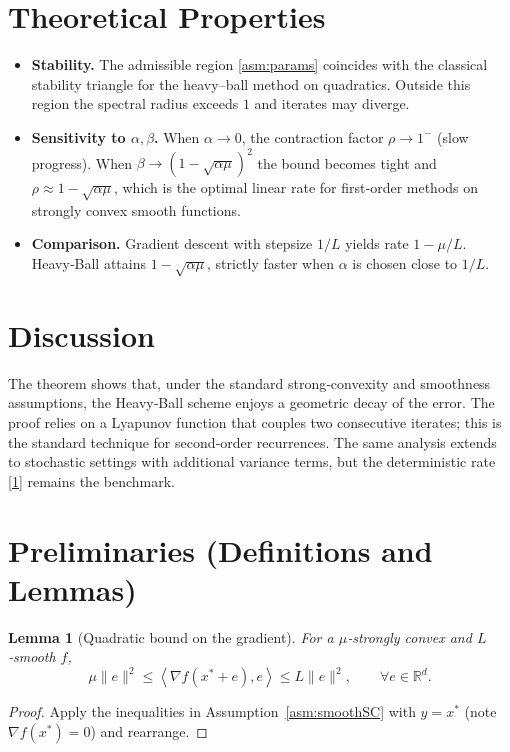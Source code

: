 \documentclass[11pt]{article}
\newtheorem{lemma}{Lemma}
\newcommand{\ip}[2]{\left\langle #1,#2\right\rangle}
\newcommand{\grad}{\nabla}
\begin{document}
\section*{Theoretical Properties}
\begin{itemize}
\item \textbf{Stability.} The admissible region \eqref{asm:params}
coincides with the classical stability triangle for the heavy–ball
method on quadratics. Outside this region the spectral radius exceeds
$1$ and iterates may diverge.
\item \textbf{Sensitivity to $\alpha,\beta$.}  
When $\alpha\to0$, the contraction factor $\rho\to1^{-}$ (slow progress).  
When $\beta\to(1-\sqrt{\alpha\mu})^{2}$ the bound becomes tight and
$\rho\approx 1-\sqrt{\alpha\mu}$, which is the optimal linear rate for
first‑order methods on strongly convex smooth functions.
\item \textbf{Comparison.}  
Gradient descent with stepsize $1/L$ yields rate $1-\mu/L$.  
Heavy‑Ball attains $1-\sqrt{\alpha\mu}$, strictly faster when $\alpha$
is chosen close to $1/L$.
\end{itemize}

\section*{Discussion}
The theorem shows that, under the standard strong‑convexity and
smoothness assumptions, the Heavy‑Ball scheme enjoys a geometric decay
of the error. The proof relies on a Lyapunov function that couples two
consecutive iterates; this is the standard technique for second‑order
recurrences. The same analysis extends to stochastic settings with
additional variance terms, but the deterministic rate \eqref{1} remains
the benchmark.

\section*{Preliminaries (Definitions and Lemmas)}
\begin{lemma}[Quadratic bound on the gradient]\label{lem:gradbound}
For a $\mu$‑strongly convex and $L$‑smooth $f$,
\[
\mu\|e\|^{2}\le\ip{\grad f(x^{*}+e)}{e}\le L\|e\|^{2},
\qquad\forall e\in\mathbb R^{d}.
\]
\end{lemma}
\begin{proof}
Apply the inequalities in Assumption~\ref{asm:smoothSC} with
$y=x^{*}$ (note $\grad f(x^{*})=0$) and rearrange.
\end{proof}
\end{document}
